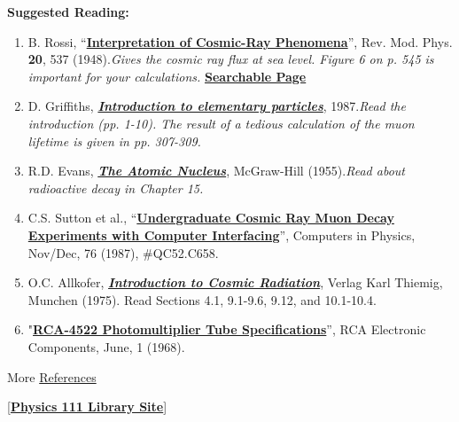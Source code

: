 \documentclass{../lab}
\begin{document}
\noindent\textbf{Suggested Reading:}

\begin{enumerate}
    \item B. Rossi, ``\href{http://rmp.aps.org/abstract/RMP/v20/i3/p537\_1}{\textbf{Interpretation of Cosmic-Ray Phenomena}}'', Rev. Mod. Phys. \textbf{20}, 537 (1948).\emph{Gives the cosmic ray flux at sea level. Figure 6 on p. 545 is important for your calculations.} \href{http://physics111.lib.berkeley.edu/Physics111/Reprints/MUO/02-Cosmic-Ray\_Phenomena.pdf}{\textbf{Searchable Page}}

    \item D. Griffiths, \emph{\href{http://physics111.lib.berkeley.edu/Physics111/Reprints/MUO/04-Introduction\_to\_Elementary\_Particles.pdf}{\textbf{Introduction to elementary particles}}}, 1987.\emph{Read the introduction (pp. 1-10). The result of a tedious calculation of the muon lifetime is given in pp. 307-309.}

    \item R.D. Evans, \emph{\href{http://physics111.lib.berkeley.edu/Physics111/Reprints/MUO/05-The\_Atomic\_Nucleus.pdf}{\textbf{The Atomic Nucleus}}}, McGraw-Hill (1955).\emph{Read about radioactive decay in Chapter 15.}

    \item C.S. Sutton et al., ``\href{http://physics111.lib.berkeley.edu/Physics111/Reprints/MUO/01-Undergraduate\_Cosmic\_Ray\_Muon\_Decay.pdf}{\textbf{Undergraduate Cosmic Ray Muon Decay Experiments with Computer Interfacing}}'', Computers in Physics, Nov/Dec, 76 (1987), \#QC52.C658.

    \item O.C. Allkofer, \emph{\href{http://physics111.lib.berkeley.edu/Physics111/Reprints/MUO/06-Introduction\_to\_Cosmic\_Radiation.pdf}{\textbf{Introduction to Cosmic Radiation}}}, Verlag Karl Thiemig, Munchen (1975). Read Sections 4.1, 9.1-9.6, 9.12, and 10.1-10.4.

    \item "\href{http://physics111.lib.berkeley.edu/Physics111/Equipment\_Manuals/RCA\_PMT.pdf}{\textbf{RCA-4522 Photomultiplier Tube Specifications}}”, RCA Electronic Components, June, 1 (1968).
\end{enumerate}

More \hyperref[sec:References]{References}

[\href{http://physics111.lib.berkeley.edu/Physics111/Reprints/MUO/MUO\_index.html}{\textbf{Physics 111 Library Site}}]
\end{document}
